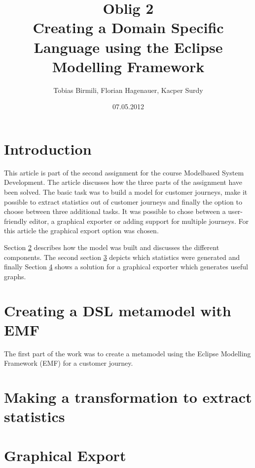 \documentclass[12pt]{scrartcl}
\title{Oblig 2 \\ Creating a Domain Specific Language using the Eclipse Modelling Framework}
\author{Tobias Birmili, Florian Hagenauer, Kacper Surdy}
\date{07.05.2012}
\begin{document}
\maketitle

\tableofcontents

\section{Introduction}

This article is part of the second assignment for the course Modelbased System Development. The article discusses
how the three parts of the assignment have been solved. The basic task was to build a model for customer journeys,
make it possible to extract statistics out of customer journeys and finally the option to choose between three
additional tasks. It was possible to chose between a user-friendly editor, a graphical exporter or adding support
for multiple journeys. For this article the graphical export option was chosen.

Section \ref{section:model} describes how the model was built and discusses the different components. The second
section \ref{section:statistic} depicts which statistics were generated and finally Section \ref{section:export}
shows a solution for a graphical exporter which generates useful graphs.

\section{Creating a DSL metamodel with EMF} \label{section:model}

The first part of the work was to create a metamodel using the Eclipse Modelling Framework (EMF) for a customer
journey.
\section{Making a transformation to extract statistics} \label{section:statistic}

\section{Graphical Export} \label{section:export}
\end{document}
